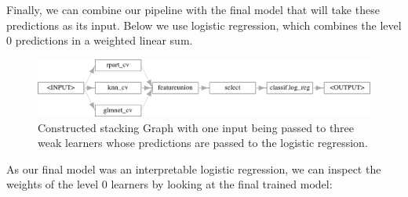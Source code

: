 Finally, we can combine our pipeline with the final model that will take
these predictions as its input. Below we use logistic
regression, which combines the level 0
predictions in a weighted linear sum.

\begin{Shaded}
\begin{Highlighting}[]
\OtherTok{=}\SpecialCharTok{\%\textgreater{}\textgreater{}\%} \NormalTok{(}\NormalTok{, }\NormalTok{(}\NormalTok{))}
\SpecialCharTok{$}\NormalTok{(} \NormalTok{)}
\end{Highlighting}
\end{Shaded}

\begin{figure}

{\centering \includegraphics[width=1\textwidth,height=\textheight]{chapters/chapter8/non-sequential_pipelines_and_tuning_files/figure-pdf/fig-pipelines-stackinggraph-1.png}

}

\caption{\label{fig-pipelines-stackinggraph}Constructed stacking Graph
with one input being passed to three weak learners whose predictions are
passed to the logistic regression.}

\end{figure}

As our final model was an interpretable logistic regression, we can
inspect the weights of the level 0 learners by looking at the final
trained model:

\begin{Shaded}
\begin{Highlighting}[]
\OtherTok{=} 
\SpecialCharTok{$}\NormalTok{(}\NormalTok{(}\NormalTok{))}
\SpecialCharTok{$}\NormalTok{()}\SpecialCharTok{$}
\end{Highlighting}
\end{Shaded}

